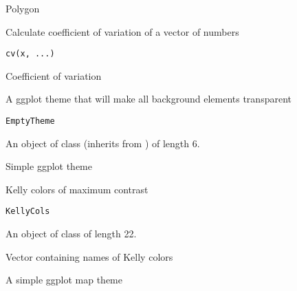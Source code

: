 \documentclass[a4paper]{book}
\begin{document}
%
\begin{Value}
Polygon
\end{Value}
%
\begin{Description}\relax
Calculate coefficient of variation of a vector of numbers
\end{Description}
%
\begin{Usage}
\begin{verbatim}
cv(x, ...)
\end{verbatim}
\end{Usage}
%
\begin{Value}
Coefficient of variation
\end{Value}
%
\begin{Description}\relax
A ggplot theme that will make all background elements transparent
\end{Description}
%
\begin{Usage}
\begin{verbatim}
EmptyTheme
\end{verbatim}
\end{Usage}
%
\begin{Format}
An object of class  (inherits from ) of length 6.
\end{Format}
%
\begin{Value}
Simple ggplot theme
\end{Value}
%
\begin{Description}\relax
Kelly colors of maximum contrast
\end{Description}
%
\begin{Usage}
\begin{verbatim}
KellyCols
\end{verbatim}
\end{Usage}
%
\begin{Format}
An object of class  of length 22.
\end{Format}
%
\begin{Value}
Vector containing names of Kelly colors
\end{Value}
%
\begin{Description}\relax
A simple ggplot map theme
\end{Description}
\end{document}
